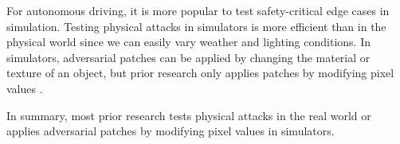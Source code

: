 For autonomous driving, it is more popular to test safety-critical edge cases in simulation. Testing physical attacks in simulators is more efficient than in the physical world since we can easily vary weather and lighting conditions. In simulators, adversarial patches can be applied by changing the material or texture of an object, but prior research only applies patches by modifying pixel values \cite{mathov2021enhancing} \cite{nesti2022evaluating} \cite{rossolini2022realworld}.

In summary, most prior research tests physical attacks in the real world or applies adversarial patches by modifying pixel values in simulators.